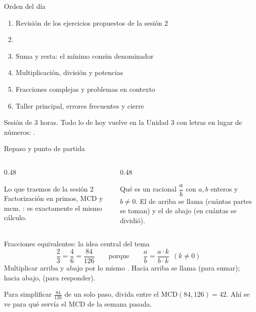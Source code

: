 \documentclass[aspectratio=169,10pt]{beamer}
\begin{document}
\portada

\begin{frame}{Orden del día}
  \begin{enumerate}
    \item Revisión de los ejercicios propuestos de la sesión 2
    \item {}
    \item Suma y resta: el mínimo común denominador
    \item Multiplicación, división y potencias
    \item Fracciones complejas y problemas en contexto
    \item Taller principal, errores frecuentes y cierre
  \end{enumerate}

  \vspace{0.25cm}
  {\footnotesize\color{uniGris} Sesión de 3 horas. Todo lo de hoy vuelve en la
  Unidad 3 con letras en lugar de números: .}
\end{frame}

\begin{frame}{Repaso y punto de partida}
  \scriptsize
  \begin{columns}[T,onlytextwidth]
    \begin{column}{0.48\textwidth}
      \begin{block}{Lo que traemos de la sesión 2}
        \tiny
        Factorización en primos, MCD y mcm. : es exactamente el mismo cálculo.
      \end{block}
    \end{column}
    \begin{column}{0.48\textwidth}
      \begin{block}{Qué es un racional}
        \tiny
        $\dfrac{a}{b}$ con $a,b$ enteros y $b\neq 0$. El de arriba se llama
         (cuántas partes se toman) y el de abajo
         (en cuántas se dividió).
      \end{block}
    \end{column}
  \end{columns}

  \vspace{0.12cm}
  \begin{exampleblock}{Fracciones equivalentes: la idea central del tema}
    \tiny
    \[ \frac{2}{3} = \frac{4}{6} = \frac{84}{126}
       \qquad\text{porque}\qquad
       \frac{a}{b} = \frac{a\cdot k}{b\cdot k}\ \ (k\neq 0) \]
    Multiplicar arriba y abajo por lo mismo .
    Hacia arriba se llama  (para sumar); hacia abajo,
     (para responder).
  \end{exampleblock}

  \vspace{0.06cm}
  {\tiny\color{uniGris} Para simplificar $\tfrac{84}{126}$ de un solo paso,
  divida entre el $\mathrm{MCD}(84,126)=42$. Ahí se ve para qué servía el MCD
  de la semana pasada.}
\end{frame}
\end{document}
